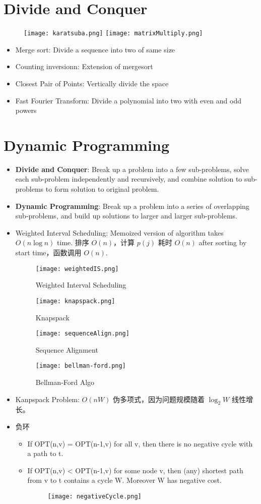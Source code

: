 \documentclass[10pt,a4paper,twocolumn]{article}
\begin{document}
\section{Divide and Conquer}
\begin{figure}[h]
    \centering
    \texttt{[image: karatsuba.png]}
    \texttt{[image: matrixMultiply.png]}
\end{figure}
\begin{itemize}
  \item Merge sort: Divide a sequence into two of same size
  \item Counting inversionn: Extension of mergesort
  \item Closest Pair of Points: Vertically divide the space
  \item Fast Fourier Transform: Divide a polynomial into two with even and odd powers
\end{itemize}

\section{Dynamic Programming}
\begin{itemize}
  \item{\textbf{Divide and Conquer}}: Break up a problem into a few sub-problems, solve each sub-problem independently and recursively, and combine solution to sub-problems to form solution to original problem.
  \item{\textbf{Dynamic Programming}}: Break up a problem into a series of overlapping sub-problems, and build up solutions to larger and larger sub-problems.
  \item Weighted Interval Scheduling: Memoized version of algorithm takes \(O(n\log{n})\) time. 排序 \(O(n)\)，计算 \(p(j)\) 耗时 \(O(n)\) after sorting by start time，函数调用 \(O(n)\).
  \begin{figure}[h]
    \centering
    \texttt{[image: weightedIS.png]}
    \caption{Weighted Interval Scheduling}
    \texttt{[image: knapspack.png]}
    \caption{Knapspack}
    \texttt{[image: sequenceAlign.png]}
    \caption{Sequence Alignment}
    \texttt{[image: bellman-ford.png]}
    \caption{Bellman-Ford Algo}
  \end{figure}
  \item Kanpspack Problem: \(O(nW)\) 伪多项式，因为问题规模随着  \(\log_2{W}\) 线性增长。
  \item 负环
  \begin{itemize}
    \item If OPT(n,v) = OPT(n-1,v) for all v, then there is no negative cycle with a path to t.
    \item If OPT(n,v) < OPT(n-1,v) for some node v, then (any) shortest path from v to t contains a cycle W. Moreover W has negative cost.
    \begin{figure}[h]
    \centering
    \texttt{[image: negativeCycle.png]}
  \end{figure}
  \end{itemize}
\end{itemize}
\end{document}

